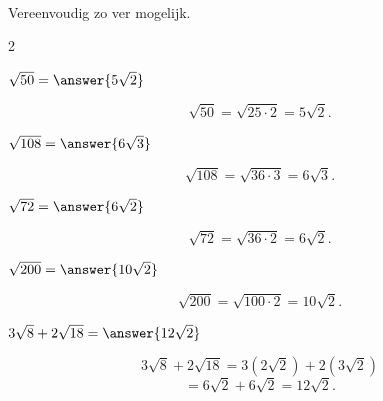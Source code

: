 \documentclass{ximera}
\begin{document}
    \begin{oefening}[Wortels]{\oefB\ESS}
        \\
        
        Vereenvoudig zo ver mogelijk.
        
        \begin{multicols}{2}
        
        \begin{question}
        $\sqrt{50}=\answer{5\sqrt2}$
        
        \begin{oplossing}
        \[
        \sqrt{50}
        =\sqrt{25\cdot2}
        =5\sqrt2.
        \]
        \end{oplossing}
        \end{question}
        
        
        \begin{question}
        $\sqrt{108}=\answer{6\sqrt3}$
        
        \begin{oplossing}
        \[
        \sqrt{108}
        =\sqrt{36\cdot3}
        =6\sqrt3.
        \]
        \end{oplossing}
        \end{question}
        
        
        \begin{question}
        $\sqrt{72}=\answer{6\sqrt2}$
        
        \begin{oplossing}
        \[
        \sqrt{72}
        =\sqrt{36\cdot2}
        =6\sqrt2.
        \]
        \end{oplossing}
        \end{question}
        
        
        \begin{question}
        $\sqrt{200}=\answer{10\sqrt2}$
        
        \begin{oplossing}
        \[
        \sqrt{200}
        =\sqrt{100\cdot2}
        =10\sqrt2.
        \]
        \end{oplossing}
        \end{question}
        
        
        \begin{question}
        $3\sqrt8+2\sqrt{18}=\answer{12\sqrt2}$
        
        \begin{oplossing}
        \[
        3\sqrt8+2\sqrt{18}
        =3(2\sqrt2)+2(3\sqrt2)
        \]
        \[
        =6\sqrt2+6\sqrt2
        =12\sqrt2.
        \]
        \end{oplossing}
        \end{question}
        

\end{multicols}
\end{oefening}
\end{document}

